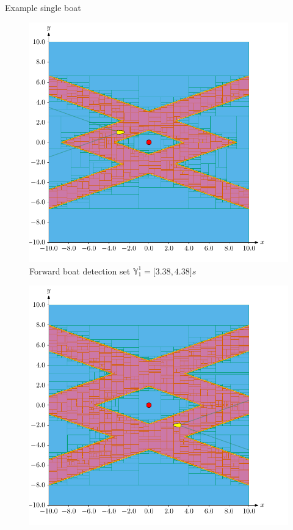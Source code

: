 \documentclass{beamer}
\begin{document}
            \begin{frame}{Example single boat}
                \begin{minipage}{0.45\textwidth}
                    \begin{figure}
                            \includegraphics[width=\textwidth]{imgs/forward}
                            \caption{Forward boat detection set $\mathbb{Y}_1^1 = \lbrack3.38, 4.38\rbrack s$}
                    \end{figure}
                \end{minipage}
                \hfill
                \begin{minipage}{0.45\textwidth}
                    \begin{figure}
                            \includegraphics[width=\textwidth]{imgs/backward}

\end{figure}
\end{minipage}
\end{frame}
\end{document}
